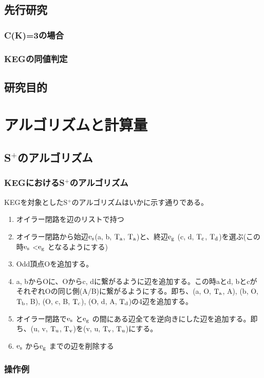 \documentclass[11pt,a4j]{jreport}
\newcommand{\splus}{S${}^\text{+}$}
\newcommand{\fl}[1]{$\rm{#1}$}
\begin{document}
\section{先行研究}
\subsection{C(K)=3の場合}
\subsection{KEGの同値判定}

\section{研究目的}

\chapter{アルゴリズムと計算量}

\section{\splus のアルゴリズム}
\subsection{KEGにおける\splus のアルゴリズム}
KEGを対象とした\splus のアルゴリズムはいかに示す通りである。
\begin{enumerate}
    \item オイラー閉路を辺のリストで持つ
    \item オイラー閉路から始辺\fl{e_s}(a, b, \fl{T_a}, \fl{T_a})と、終辺\fl{e_g} (c, d, \fl{T_c}, \fl{T_d})を選ぶ(この時\fl{e_s} <\fl{e_g} となるようにする)
    \item Odd頂点Oを追加する。
    \item a, bからOに、Oからc, dに繋がるように辺を追加する。この時aとd, bとcがそれぞれOの同じ側(A/B)に繋がるようにする。即ち、(a, O, \fl{T_a}, A), (b, O, \fl{T_b}, B), (O, c, B, \fl{T_c}), (O, d, A, \fl{T_d})の4辺を追加する。
    \item オイラー閉路で\fl{e_s} と\fl{e_g} の間にある辺全てを逆向きにした辺を追加する。即ち、(u, v, \fl{T_u}, \fl{T_v})を(v, u, \fl{T_v}, \fl{T_u})にする。
    \item \fl{e_s} から\fl{e_g} までの辺を削除する
\end{enumerate}
\subsection{操作例}
\end{document}
